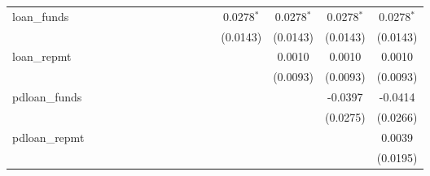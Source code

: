 \begin{table}[htbp]
\begin{tiny}
\begin{tabular}{lccccccccccccccc}
         loan\_funds             &                 &                 &                 &                 &                 &                 &                 &                 &                 &                 &                 & 0.0278$^{*}$    & 0.0278$^{*}$    & 0.0278$^{*}$    & 0.0278$^{*}$\\
                                  &                 &                 &                 &                 &                 &                 &                 &                 &                 &                 &                 & (0.0143)        & (0.0143)        & (0.0143)        & (0.0143)\\
         loan\_repmt             &                 &                 &                 &                 &                 &                 &                 &                 &                 &                 &                 &                 & 0.0010          & 0.0010          & 0.0010\\
                                  &                 &                 &                 &                 &                 &                 &                 &                 &                 &                 &                 &                 & (0.0093)        & (0.0093)        & (0.0093)\\
         pdloan\_funds           &                 &                 &                 &                 &                 &                 &                 &                 &                 &                 &                 &                 &                 & -0.0397         & -0.0414\\
                                  &                 &                 &                 &                 &                 &                 &                 &                 &                 &                 &                 &                 &                 & (0.0275)        & (0.0266)\\
         pdloan\_repmt           &                 &                 &                 &                 &                 &                 &                 &                 &                 &                 &                 &                 &                 &                 & 0.0039\\
                                  &                 &                 &                 &                 &                 &                 &                 &                 &                 &                 &                 &                 &                 &                 & (0.0195)\\

\end{tabular}
\end{tiny}
\end{table}
